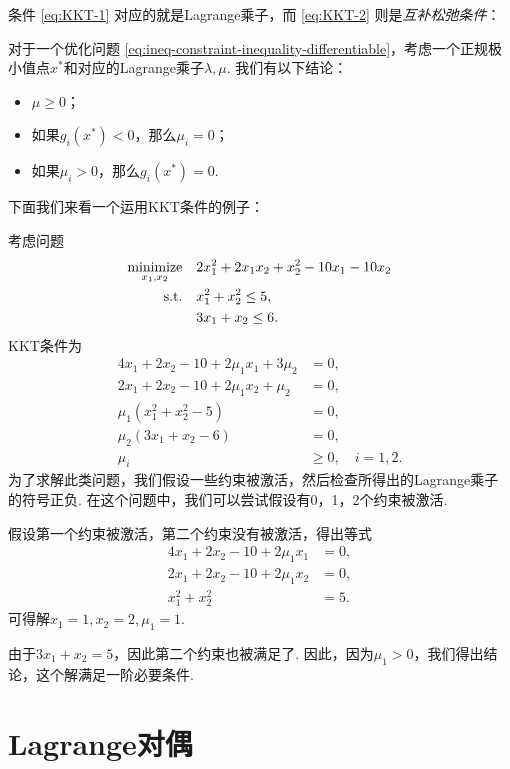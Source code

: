 条件 \eqref{eq:KKT-1} 对应的就是Lagrange乘子，而 \eqref{eq:KKT-2} 则是\textit{互补松弛条件}：

\begin{proposition}[互补松弛条件]\label{proposition:complementary-slackness}
    对于一个优化问题 \eqref{eq:ineq-constraint-inequality-differentiable}，考虑一个正规极小值点$x^*$和对应的Lagrange乘子$\lambda,\mu$. 我们有以下结论：
    \begin{itemize}
        \item $\mu\geq 0$；
        \item 如果$g_i(x^*)<0$，那么$\mu_i=0$；
        \item 如果$\mu_i>0$，那么$g_i(x^*)=0$.
    \end{itemize}
\end{proposition}

下面我们来看一个运用KKT条件的例子：
\begin{example}
考虑问题
\begin{align*}
    \operatorname*{minimize}_{x_1,x_2} \quad &2x_1^2+2x_1x_2+x_2^2-10x_1-10x_2 \\
    \text{s.t.}\quad &x_1^2+x_2^2\leq 5, \\
    & 3x_1+x_2\leq 6.
\end{align*}
KKT条件为
\begin{align*}
    4x_1+2x_2-10+2\mu_1x_1+3\mu_2&=0, \\
    2x_1+2x_2-10+2\mu_1x_2+\mu_2&=0, \\
    \mu_1(x_1^2+x_2^2-5)&=0, \\
    \mu_2(3x_1+x_2-6)&=0,\\
    \mu_i&\geq 0,\quad i=1,2.
\end{align*}
为了求解此类问题，我们假设一些约束被激活，然后检查所得出的Lagrange乘子的符号正负. 在这个问题中，我们可以尝试假设有0，1，2个约束被激活. 

假设第一个约束被激活，第二个约束没有被激活，得出等式
\begin{align*}
4x_1+2x_2-10+2\mu_1x_1&=0, \\
2x_1+2x_2-10+2\mu_1x_2&=0, \\
x_1^2+x_2^2&=5.
\end{align*}
可得解$x_1=1,x_2=2,\mu_1=1.$

由于$3x_1+x_2=5$，因此第二个约束也被满足了. 因此，因为$\mu_1 > 0$，我们得出结论，这个解满足一阶必要条件. 
\end{example}

\section{Lagrange对偶}

